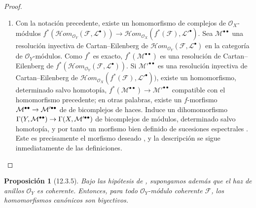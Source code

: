 \documentclass[10pt,oneside,openany]{book}
\theoremstyle{egaenv}\newtheorem*{env}{---}
\theoremstyle{egastatement}
\newtheorem*{proposition}{Proposición}
\theoremstyle{egadescription}
\renewcommand{\to}{\mathchoice{\longrightarrow}{\rightarrow}{\rightarrow}{\rightarrow}}
\begin{document}
\begin{proof}
\begin{enumerate}
  \item[\rm(ii)]
  Con la notación precedente, existe un homomorfismo de complejos de
  $\mathcal O_X$-módulos
  $f^*(\mathcal{H}om_{\mathcal O_Y}(\mathcal F,\mathcal L^\bullet))\longrightarrow\mathcal{H}om_{\mathcal O_X}(f^*(\mathcal F),\mathcal L'^\bullet)$.
  Sea $\mathcal M^{\bullet\bullet}$ una resolución inyectiva de
  Cartan--Eilenberg de
  $\mathcal{H}om_{\mathcal O_Y}(\mathcal F,\mathcal L^\bullet)$ en la categoría de
  $\mathcal O_Y$-módulos.  Como $f^*$ es exacto,
  $f^*(\mathcal M^{\bullet\bullet})$ es una resolución de Cartan--Eilenberg de
  $f^*(\mathcal{H}om_{\mathcal O_Y}(\mathcal F,\mathcal L^\bullet))$.
  Si $\mathcal M'^{\bullet\bullet}$ es una resolución inyectiva de
  Cartan--Eilenberg de
  $\mathcal{H}om_{\mathcal O_X}(f^*(\mathcal F),\mathcal L'^\bullet))$, existe
   un homomorfismo, determinado salvo homotopía,
  $f^*(\mathcal M^{\bullet\bullet})\longrightarrow\mathcal M'^{\bullet\bullet}$
  compatible con el homomorfismo precedente; en otras palabras, existe
  un $f$-morfismo
  $\mathcal M^{\bullet\bullet}\to
\mathcal M'^{\bullet\bullet}$ de
  de bicomplejos de haces.
  Induce un dihomomorfismo
  $\Gamma(Y,\mathcal M^{\bullet\bullet})\to
\Gamma(X,\mathcal M'^{\bullet\bullet})$
  de bicomplejos de módulos, determinado salvo homotopía, y por tanto
  un morfismo bien definido de sucesiones espectrales
  .  Este es precisamente el morfismo deseado
  , y la descripción
   se sigue inmediatamente de las definiciones.
\end{enumerate}
\end{proof}

\begin{proposition}[12.3.5]
\label{0.12.3.5}
\label{0.12.3.5-fr}
Bajo las hipótesis de , supongamos además que el
haz de anillos $\mathcal O_Y$ es coherente.
Entonces, para todo $\mathcal O_Y$-módulo coherente $\mathcal F$, los
homomorfismos canónicos  son biyectivos.
\end{proposition}
\end{document}
